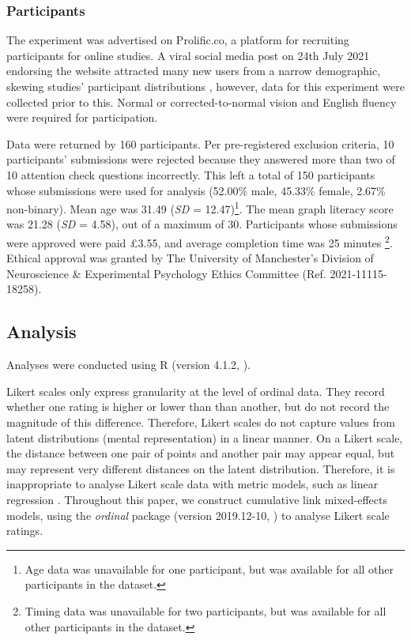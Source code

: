 \documentclass[journal]{vgtc}                %
\begin{document}
\hypertarget{participants}{%
\subsubsection{Participants}\label{participants}}

The experiment was advertised on Prolific.co, a platform for recruiting
participants for online studies. A viral social media post on 24th July
2021 endorsing the website attracted many new users from a narrow
demographic, skewing studies' participant distributions
\citep{charalambides_we_2021}, however, data for this experiment were
collected prior to this. Normal or corrected-to-normal vision and
English fluency were required for participation.

Data were returned by 160 participants. Per pre-registered exclusion
criteria, 10 participants' submissions were rejected because they
answered more than two of 10 attention check questions incorrectly. This
left a total of 150 participants whose submissions were used for
analysis (52.00\% male, 45.33\%
female, 2.67\% non-binary). Mean age was
31.49 (\emph{SD} = 12.47)\footnote{Age data was unavailable for one participant, but was available
  for all other participants in the dataset.}. The mean
graph literacy score was 21.28 (\emph{SD} =
4.58), out of a maximum of 30. Participants
whose submissions were approved were paid £3.55, and average completion
time was 25 minutes \footnote{Timing data was unavailable for two participants, but was
  available for all other participants in the dataset.}. Ethical
approval was granted by The University of Manchester's Division of
Neuroscience \& Experimental Psychology Ethics Committee (Ref.
2021-11115-18258).

\hypertarget{analysis}{%
\subsection{Analysis}\label{analysis}}

Analyses were conducted using R (version 4.1.2, \citep{r_core_team_r_2021}).

Likert scales only express granularity at the level of ordinal data.
They record whether one rating is higher or lower than than another, but
do not record the magnitude of this difference. Therefore, Likert scales
do not capture values from latent distributions (mental representation)
in a linear manner. On a Likert scale, the distance between one pair of
points and another pair may appear equal, but may represent very
different distances on the latent distribution. Therefore, it is
inappropriate to analyse Likert scale data with metric models, such as
linear regression \citep{liddell_analyzing_2018}. Throughout this paper, we
construct cumulative link mixed-effects models, using the \emph{ordinal}
package (version 2019.12-10, \citep{christensen_ordinalregression_2019}) to analyse Likert scale
ratings.
\end{document}
